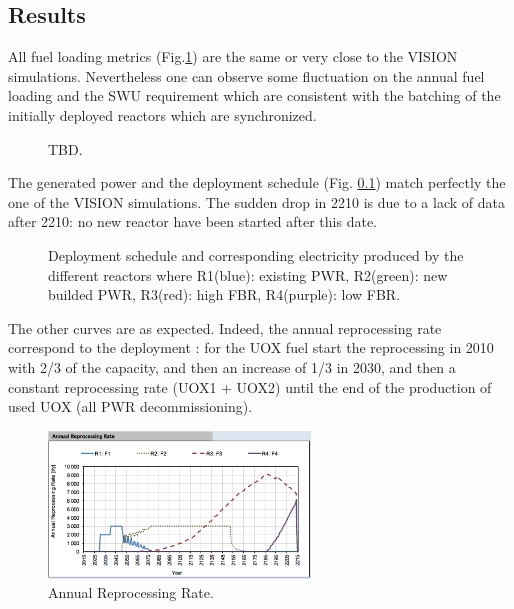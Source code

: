 \documentclass[12pt]{article}
\begin{document}
\subsection{Results}
All fuel loading metrics
(Fig.\ref{fig:RessourceUsed}) are the same or very
close to the VISION simulations. Nevertheless one
can observe some fluctuation on the annual fuel
loading and the SWU requirement which are
consistent with the batching of the initially
deployed reactors which are synchronized.

\begin{figure}[h!]
\centering
{}
\caption{TBD.\label{fig:RessourceUsed} }
\end{figure}

The generated power and the deployment schedule
(Fig. \ref{})  match perfectly the one of the
VISION simulations. The sudden drop in 2210 is
due to a lack of data after 2210: no new reactor
have been started after this date.\\

\begin{figure}[h!]
\centering
{}
\caption{Deployment schedule and corresponding electricity produced by the different reactors where
R1(blue): existing PWR, R2(green): new builded PWR, R3(red): high FBR, R4(purple): low FBR.\label{fig:deployment_bis} }
\end{figure}


The other curves are as expected. Indeed, the
annual reprocessing rate correspond to the
deployment :  for the UOX fuel start the
reprocessing in 2010 with 2/3 of the capacity, and
then an increase of 1/3 in 2030, and then a
constant reprocessing rate (UOX1 + UOX2) until the
end of the production of used UOX (all PWR
decommissioning).


\begin{figure}[h!]
\centering
\includegraphics[width=0.62\textwidth]	{img/AnnualReprocessingRate_1}
\caption{Annual Reprocessing Rate.}
\label{fig:reprocessing_1}
\end{figure}
\end{document}
